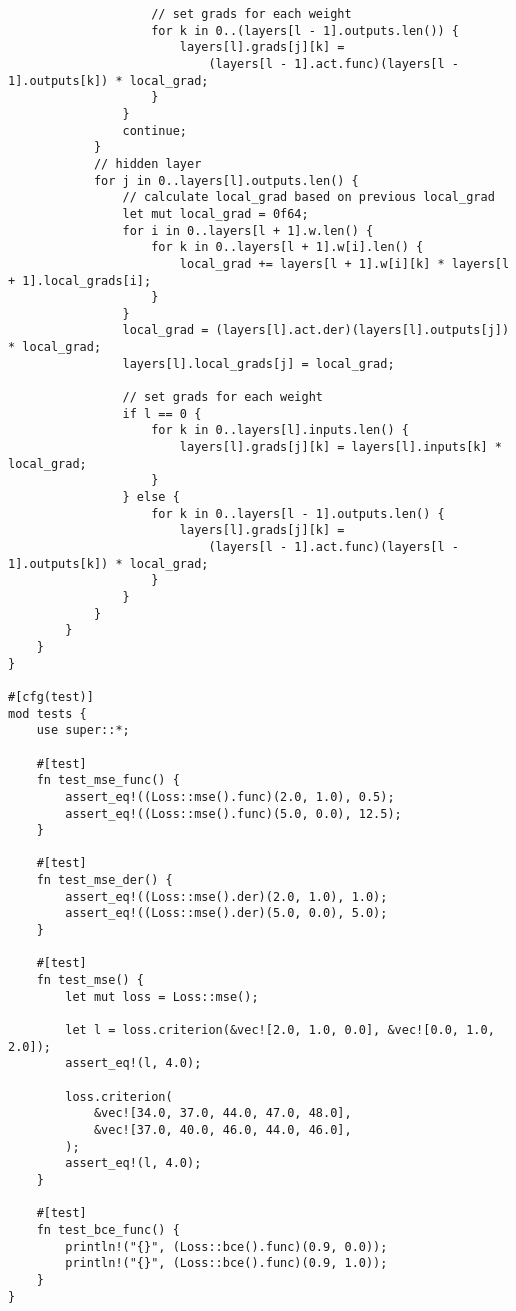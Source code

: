 \begin{verbatim}
                    // set grads for each weight
                    for k in 0..(layers[l - 1].outputs.len()) {
                        layers[l].grads[j][k] =
                            (layers[l - 1].act.func)(layers[l - 1].outputs[k]) * local_grad;
                    }
                }
                continue;
            }
            // hidden layer
            for j in 0..layers[l].outputs.len() {
                // calculate local_grad based on previous local_grad
                let mut local_grad = 0f64;
                for i in 0..layers[l + 1].w.len() {
                    for k in 0..layers[l + 1].w[i].len() {
                        local_grad += layers[l + 1].w[i][k] * layers[l + 1].local_grads[i];
                    }
                }
                local_grad = (layers[l].act.der)(layers[l].outputs[j]) * local_grad;
                layers[l].local_grads[j] = local_grad;

                // set grads for each weight
                if l == 0 {
                    for k in 0..layers[l].inputs.len() {
                        layers[l].grads[j][k] = layers[l].inputs[k] * local_grad;
                    }
                } else {
                    for k in 0..layers[l - 1].outputs.len() {
                        layers[l].grads[j][k] =
                            (layers[l - 1].act.func)(layers[l - 1].outputs[k]) * local_grad;
                    }
                }
            }
        }
    }
}

#[cfg(test)]
mod tests {
    use super::*;

    #[test]
    fn test_mse_func() {
        assert_eq!((Loss::mse().func)(2.0, 1.0), 0.5);
        assert_eq!((Loss::mse().func)(5.0, 0.0), 12.5);
    }

    #[test]
    fn test_mse_der() {
        assert_eq!((Loss::mse().der)(2.0, 1.0), 1.0);
        assert_eq!((Loss::mse().der)(5.0, 0.0), 5.0);
    }

    #[test]
    fn test_mse() {
        let mut loss = Loss::mse();

        let l = loss.criterion(&vec![2.0, 1.0, 0.0], &vec![0.0, 1.0, 2.0]);
        assert_eq!(l, 4.0);

        loss.criterion(
            &vec![34.0, 37.0, 44.0, 47.0, 48.0],
            &vec![37.0, 40.0, 46.0, 44.0, 46.0],
        );
        assert_eq!(l, 4.0);
    }

    #[test]
    fn test_bce_func() {
        println!("{}", (Loss::bce().func)(0.9, 0.0));
        println!("{}", (Loss::bce().func)(0.9, 1.0));
    }
}
\end{verbatim}
